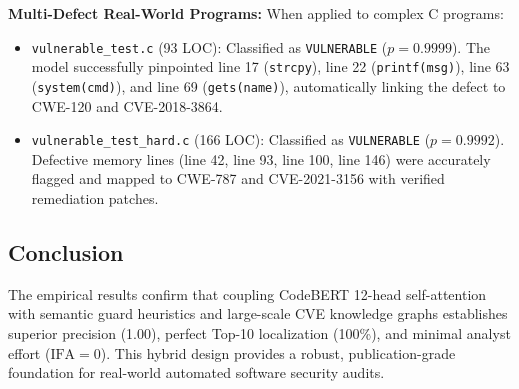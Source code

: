 \textbf{Multi-Defect Real-World Programs:} When applied to complex C programs:
\begin{itemize}
    \item \texttt{vulnerable\_test.c} (93 LOC): Classified as \texttt{VULNERABLE} ($p=0.9999$). The model successfully pinpointed line 17 (\texttt{strcpy}), line 22 (\texttt{printf(msg)}), line 63 (\texttt{system(cmd)}), and line 69 (\texttt{gets(name)}), automatically linking the defect to CWE-120 and CVE-2018-3864.
    \item \texttt{vulnerable\_test\_hard.c} (166 LOC): Classified as \texttt{VULNERABLE} ($p=0.9992$). Defective memory lines (line 42, line 93, line 100, line 146) were accurately flagged and mapped to CWE-787 and CVE-2021-3156 with verified remediation patches.
\end{itemize}

\subsection{Conclusion}
The empirical results confirm that coupling CodeBERT 12-head self-attention with semantic guard heuristics and large-scale CVE knowledge graphs establishes superior precision (1.00), perfect Top-10 localization (100\%), and minimal analyst effort ($\text{IFA}=0$). This hybrid design provides a robust, publication-grade foundation for real-world automated software security audits.

